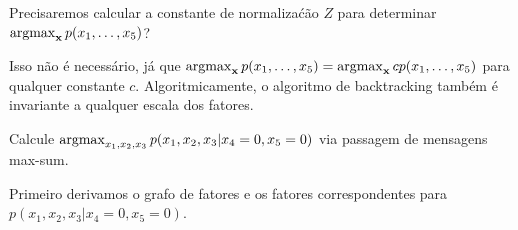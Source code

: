 \begin{exenumerate}
    \item Precisaremos calcular a constante de normaliza\'c\~ao $Z$ para determinar $\operatorname*{\mathrm{argmax}}_{\mathbf{x}} p(x_1, \ldots, x_5)$?
    
    \begin{solution}
        Isso n\~ao \'e necess\'ario, j\'a que $\operatorname*{\mathrm{argmax}}_{\mathbf{x}} p(x_1, \ldots, x_5) = \operatorname*{\mathrm{argmax}}_{\mathbf{x}} c p(x_1, \ldots, x_5)$ para qualquer constante $c$. Algoritmicamente, o algoritmo de backtracking tamb\'em \'e invariante a qualquer escala dos fatores.
    \end{solution}
    \item Calcule $\operatorname*{\mathrm{argmax}}_{x_1, x_2, x_3} p(x_1, x_2, x_3 | x_4=0, x_5=0)$ via passagem de mensagens max-sum.
    \begin{solution}
        Primeiro derivamos o grafo de fatores e os fatores correspondentes para
        $p(x_1, x_2, x_3 | x_4=0, x_5=0)$.
        

\end{solution}
\end{exenumerate}
